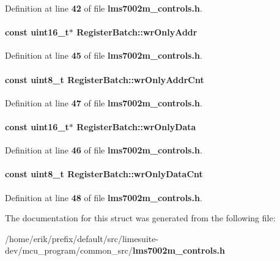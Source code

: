 Definition at line {\bf 42} of file {\bf lms7002m\+\_\+controls.\+h}.

\paragraph[{wr\+Only\+Addr}]{\setlength{\rightskip}{0pt plus 5cm}const uint16\+\_\+t$\ast$ Register\+Batch\+::wr\+Only\+Addr}\label{structRegisterBatch_aac3bb05294f0a2976ce95abc1ced8d11}


Definition at line {\bf 45} of file {\bf lms7002m\+\_\+controls.\+h}.

\paragraph[{wr\+Only\+Addr\+Cnt}]{\setlength{\rightskip}{0pt plus 5cm}const uint8\+\_\+t Register\+Batch\+::wr\+Only\+Addr\+Cnt}\label{structRegisterBatch_a790a219788a31139a43e955f25f40abc}


Definition at line {\bf 47} of file {\bf lms7002m\+\_\+controls.\+h}.

\paragraph[{wr\+Only\+Data}]{\setlength{\rightskip}{0pt plus 5cm}const uint16\+\_\+t$\ast$ Register\+Batch\+::wr\+Only\+Data}\label{structRegisterBatch_af5535d62068c1cfe4b7228531c53594e}


Definition at line {\bf 46} of file {\bf lms7002m\+\_\+controls.\+h}.

\paragraph[{wr\+Only\+Data\+Cnt}]{\setlength{\rightskip}{0pt plus 5cm}const uint8\+\_\+t Register\+Batch\+::wr\+Only\+Data\+Cnt}\label{structRegisterBatch_ac6016fe1606352e43f05b6bd43dc72a4}


Definition at line {\bf 48} of file {\bf lms7002m\+\_\+controls.\+h}.



The documentation for this struct was generated from the following file\+:\begin{DoxyCompactItemize}
\item 
/home/erik/prefix/default/src/limesuite-\/dev/mcu\+\_\+program/common\+\_\+src/{\bf lms7002m\+\_\+controls.\+h}\end{DoxyCompactItemize}
